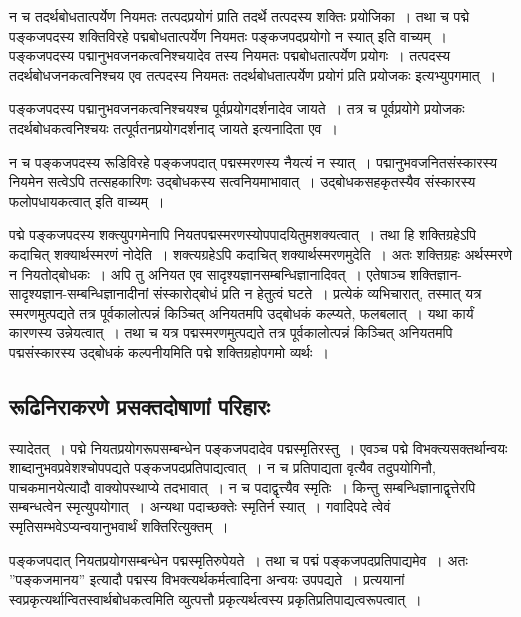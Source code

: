 			न च तदर्थबोधतात्पर्येण नियमतः तत्पदप्रयोगं प्राति तदर्थे तत्पदस्य शक्तिः प्रयोजिका~। तथा च पद्मे पङ्कजपदस्य शक्तिविरहे पद्मबोधतात्पर्येण नियमतः पङ्कजपदप्रयोगो न स्यात् इति वाच्यम्~।  पङ्कजपदस्य पद्मानुभवजनकत्वनिश्चयादेव तस्य नियमतः पद्मबोधतात्पर्येण प्रयोगः~।  तत्पदस्य तदर्थबोधजनकत्वनिश्चय एव तत्पदस्य नियमतः तदर्थबोधतात्पर्येण प्रयोगं प्रति प्रयोजकः इत्यभ्युपगमात्~।

			पङ्कजपदस्य पद्मानुभवजनकत्वनिश्चयश्च पूर्वप्रयोगदर्शनादेव जायते~।  तत्र च पूर्वप्रयोगे प्रयोजकः  तदर्थबोधकत्वनिश्चयः तत्पूर्वतनप्रयोगदर्शनाद् जायते इत्यनादिता एव~। 

			न च पङ्कजपदस्य रूडिविरहे पङ्कजपदात् पद्मस्मरणस्य नैयत्यं न स्यात्~।  पद्मानुभवजनितसंस्कारस्य नियमेन सत्वेऽपि तत्सहकारिणः उद्बोधकस्य सत्वनियमाभावात्~।  उद्बोधकसहकृतस्यैव संस्कारस्य फलोपधायकत्वात् इति वाच्यम्~। 

			पद्मे पङ्कजपदस्य शक्त्युपगमेनापि नियतपद्मस्मरणस्योपपादयितुमशक्यत्वात्~।  तथा हि शक्तिग्रहेऽपि कदाचित् शक्यार्थस्मरणं नोदेति~।  शक्त्यग्रहेऽपि कदाचित् शक्यार्थस्मरणमुदेति~।  अतः शक्तिग्रहः अर्थस्मरणे न नियतोद्बोधकः~।  अपि तु अनियत एव सादृश्यज्ञानसम्बन्धिज्ञानादिवत्~।  एतेषाञ्च  शक्तिज्ञान-सादृश्यज्ञान-सम्बन्धिज्ञानादीनां संस्कारोद्बोधं प्रति न हेतुत्वं घटते~।  प्रत्येकं व्यभिचारात्, तस्मात् यत्र स्मरणमुत्पद्यते तत्र पूर्वकालोत्पन्नं किञ्चित् अनियतमपि उद्बोधकं कल्प्यते, फलबलात्~।  यथा कार्यं कारणस्य उन्नेयत्वात्~।  तथा च यत्र पद्मस्मरणमुत्पद्यते तत्र पूर्वकालोत्पन्नं किञ्चित् अनियतमपि पद्मसंस्कारस्य उद्बोधकं कल्पनीयमिति पद्मे शक्तिग्रहोपगमो व्यर्थः~। 

		\subsection{रूढिनिराकरणे प्रसक्तदोषाणां परिहारः}

			\begin{small}
				
				स्यादेतत्~। पद्मे नियतप्रयोगरूपसम्बन्धेन पङ्कजपदादेव पद्मस्मृतिरस्तु~। एवञ्च पद्मे विभक्त्यसक्तर्थान्वयः शाब्दानुभवप्रवेशश्चोपपद्यते पङ्कजपदप्रतिपाद्यत्वात्~। न च प्रतिपाद्यता वृत्यैव तदुपयोगिनौ, पाचकमानयेत्यादौ वाक्योपस्थाप्ये तदभावात्~। न च पदाद्वृत्त्यैव स्मृतिः~। किन्तु सम्बन्धिज्ञानाद्वृत्तेरपि सम्बन्धत्वेन स्मृत्युपयोगात्~। अन्यथा पदाच्छक्तेः स्मृतिर्न स्यात्~। गवादिपदे त्वेवं स्मृतिसम्भवेऽप्यन्वयानुभवार्थं शक्तिरित्युक्तम्~। 
			\end{small}
			
			पङ्कजपदात् नियतप्रयोगसम्बन्धेन पद्मस्मृतिरुपेयते~।  तथा च पद्मं पङ्कजपदप्रतिपाद्यमेव~। अतः ”पङ्कजमानय” इत्यादौ पद्मस्य विभक्त्यर्थकर्मत्वादिना अन्वयः उपपद्यते~।  प्रत्ययानां स्वप्रकृत्यर्थान्वितस्वार्थबोधकत्वमिति व्युत्पत्तौ प्रकृत्यर्थत्वस्य प्रकृतिप्रतिपाद्यत्वरूपत्वात्~। 

